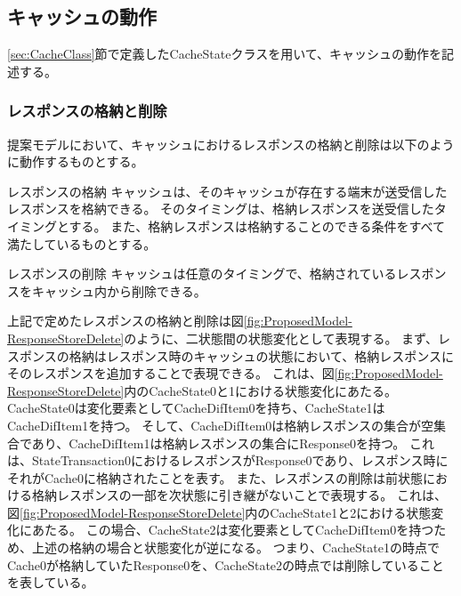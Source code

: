 \documentclass[12pt,a4paper]{jbook}
\begin{document}
\subsection{キャッシュの動作}
\ref{sec:CacheClass}節で定義したCacheStateクラスを用いて、キャッシュの動作を記述する。

\subsubsection{レスポンスの格納と削除}
提案モデルにおいて、キャッシュにおけるレスポンスの格納と削除は以下のように動作するものとする。

\begin{itembox}[l]{レスポンスの格納}
キャッシュは、そのキャッシュが存在する端末が送受信したレスポンスを格納できる。
そのタイミングは、格納レスポンスを送受信したタイミングとする。
また、格納レスポンスは格納することのできる条件をすべて満たしているものとする。
\end{itembox}

\begin{itembox}[l]{レスポンスの削除}
キャッシュは任意のタイミングで、格納されているレスポンスをキャッシュ内から削除できる。
\end{itembox}

上記で定めたレスポンスの格納と削除は図\ref{fig:ProposedModel-ResponseStoreDelete}のように、二状態間の状態変化として表現する。
まず、レスポンスの格納はレスポンス時のキャッシュの状態において、格納レスポンスにそのレスポンスを追加することで表現できる。
これは、図\ref{fig:ProposedModel-ResponseStoreDelete}内のCacheState0と1における状態変化にあたる。
CacheState0は変化要素としてCacheDifItem0を持ち、CacheState1はCacheDifItem1を持つ。
そして、CacheDifItem0は格納レスポンスの集合が空集合であり、CacheDifItem1は格納レスポンスの集合にResponse0を持つ。
これは、StateTransaction0におけるレスポンスがResponse0であり、レスポンス時にそれがCache0に格納されたことを表す。
また、レスポンスの削除は前状態における格納レスポンスの一部を次状態に引き継がないことで表現する。
これは、図\ref{fig:ProposedModel-ResponseStoreDelete}内のCacheState1と2における状態変化にあたる。
この場合、CacheState2は変化要素としてCacheDifItem0を持つため、上述の格納の場合と状態変化が逆になる。
つまり、CacheState1の時点でCache0が格納していたResponse0を、CacheState2の時点では削除していることを表している。
\end{document}
